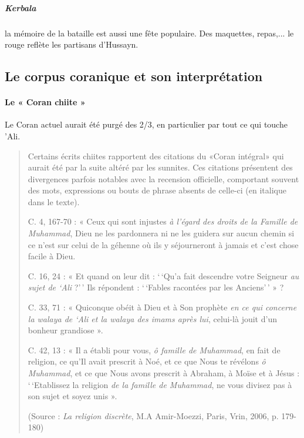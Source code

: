  \subparagraph{Kerbala} la mémoire de la bataille est aussi une fête populaire. Des maquettes, repas,... le rouge reflète les partisans d'Hussayn.
 
 
 
 
  \subsection{Le corpus coranique et son interprétation}
 
 
  \paragraph{Le « Coran chiite »}
 
 Le Coran actuel aurait été purgé des 2/3, en particulier par tout ce qui touche 'Ali.


\begin{quote}
Certains écrits chiites rapportent des citations du «Coran intégral»
qui aurait été par la suite altéré par les sunnites. Ces citations
présentent des divergences parfois notables avec la recension
officielle, comportant souvent des mots, expressions ou bouts de phrase
absents de celle-ci (en italique dans le texte).

C. 4, 167-70 : « Ceux qui sont injustes \emph{à l'égard des droits de la
Famille de Muhammad}, Dieu ne les pardonnera ni ne les guidera sur aucun
chemin si ce n'est sur celui de la géhenne où ils y séjourneront à
jamais et c'est chose facile à Dieu.

C. 16, 24 : « Et quand on leur dit : `\,`Qu'a fait descendre votre
Seigneur \emph{au sujet de `Ali} ?'\,' Ils répondent : `\,`Fables
racontées par les Anciens'\,' » ?

C. 33, 71 : « Quiconque obéit à Dieu et à Son prophète \emph{en ce qui
concerne la walaya de `Ali et la walaya des imams après lui}, celui-là
jouit d'un bonheur grandiose ».

C. 42, 13 : « Il a établi pour vous, \emph{ô famille de Muhammad}, en
fait de religion, ce qu'Il avait prescrit à Noé, et ce que Nous te
révélons \emph{ô Muhammad}, et ce que Nous avons prescrit à Abraham, à
Moïse et à Jésus : `\,`Etablissez la religion \emph{de la famille de
Muhammad}, ne vous divisez pas à son sujet et soyez unis ».

(Source : \emph{La religion discrète}, M.A Amir-Moezzi, Paris, Vrin,
2006, p. 179-180)
\end{quote}
 
